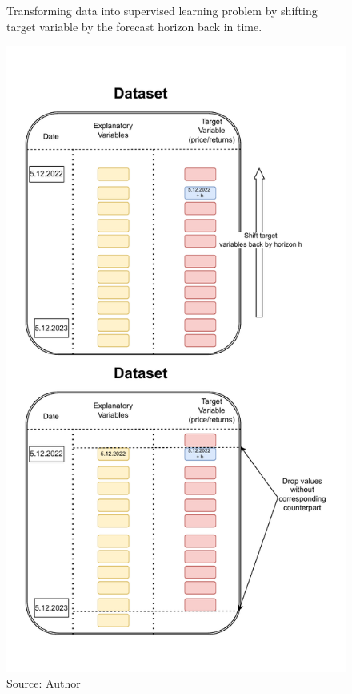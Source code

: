 \begin{figure}[!h]
    \centering
    \caption{Transforming data into supervised learning problem
    by shifting target variable by the forecast horizon back in time.}
        \includegraphics[width=1\textwidth, height=1\textheight,keepaspectratio]{Figures/data_shift.drawio.pdf}
    \caption*{Source: Author}
    \label{fig:dataset_shift}
\end{figure}

